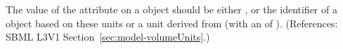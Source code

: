 The value of the attribute  on a \Model object should be
either ,  or the identifier of a
\UnitDefinition object based on these units or a unit derived from
 (with an  of ).  (References: SBML L3V1
Section~\ref{sec:model-volumeUnits}.)
